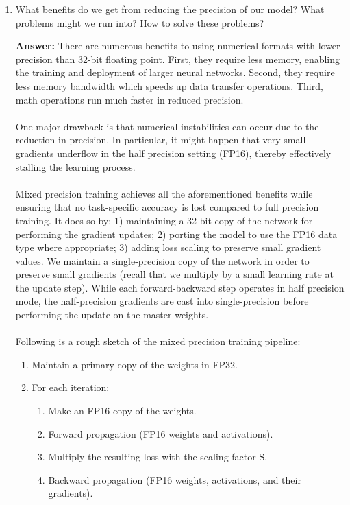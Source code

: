 \documentclass{article}
\newenvironment{QandA}{\begin{enumerate}[label=\arabic*.]}{\end{enumerate}}
\newenvironment{answer}{\par\normalfont \textbf{Answer:}}{}
\begin{document}
\begin{QandA}
    \item What benefits do we get from reducing the precision of our model? What problems might we run into? How to solve these problems?
    \begin{answer}
        There are numerous benefits to using numerical formats with lower precision than 32-bit floating point. First, they require less memory, enabling the training and deployment of larger neural networks. Second, they require less memory bandwidth which speeds up data transfer operations. Third, math operations run much faster in reduced precision.\\\\ 
        One major drawback is that numerical instabilities can occur due to the reduction in precision. In particular, it might happen that very small gradients underflow in the half precision setting (FP16), thereby effectively stalling the learning process. \\\\
        Mixed precision training achieves all the aforementioned benefits while ensuring that no task-specific accuracy is lost compared to full precision training. It does so by: 1) maintaining a 32-bit copy of the network for performing the gradient updates; 2) porting the model to use the FP16 data type where appropriate; 3) adding loss scaling to preserve small gradient values. We maintain a single-precision copy of the network in order to preserve small gradients (recall that we multiply by a small learning rate at the update step). While each forward-backward step operates in half precision mode, the half-precision gradients are cast into single-precision before performing the update on the master weights. \\\\
        Following is a rough sketch of the mixed precision training pipeline:
        \begin{enumerate}[label=\arabic*.]
            \item Maintain a primary copy of the weights in FP32. 
            \item For each iteration:
            \begin{enumerate}
                \item Make an FP16 copy of the weights.
                \item Forward propagation (FP16 weights and activations).
                \item Multiply the resulting loss with the scaling factor S.
                \item Backward propagation (FP16 weights, activations, and their gradients).

\end{enumerate}
\end{enumerate}
\end{answer}
\end{QandA}
\end{document}
